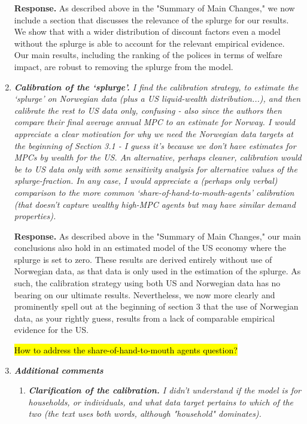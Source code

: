 \documentclass[12pt,letterpaper,english]{article}
\begin{document}
\begin{enumerate}
	\noindent \textbf{Response.} As described above in the "Summary of Main Changes," we now include a section that discusses the relevance of the splurge for our results. We show that with a wider distribution of discount factors even a model without the splurge is able to account for the relevant empirical evidence. Our main results, including the ranking of the polices in terms of welfare impact, are robust to removing the splurge from the model. 

	\item \textit{\textbf{Calibration of the `splurge'.} I find the calibration strategy, to estimate the `splurge' on Norwegian data (plus a US liquid-wealth distribution...), and then calibrate the rest to US data only, confusing - also since the authors then compare their final average annual MPC to an estimate for Norway. I would appreciate a clear motivation for why we need the Norwegian data targets at the beginning of Section 3.1 - I guess it's because we don't have estimates for MPCs by wealth for the US. An alternative, perhaps cleaner, calibration would be to US data only with some sensitivity analysis for alternative values of the splurge-fraction. In any case, I would appreciate a (perhaps only verbal) comparison to the more common `share-of-hand-to-mouth-agents' calibration (that doesn't capture wealthy high-MPC agents but may have similar demand properties).}
	
	\noindent \textbf{Response.} As described above in the "Summary of Main Changes," our main conclusions also hold in an estimated model of the US economy where the splurge is set to zero. These results are derived entirely without use of Norwegian data, as that data is only used in the estimation of the splurge. As such, the calibration strategy using both US and Norwegian data has no bearing on our ultimate results. Nevertheless, we now more clearly and prominently spell out at the beginning of section 3 that the use of Norwegian data, as your rightly guess, results from a lack of comparable empirical evidence for the US. 
	
	\hl{How to address the share-of-hand-to-mouth agents question?}

\bigskip
\bigskip

\item \textit{\textbf{Additional comments}} 

	\begin{enumerate}
		\item \textit{\textbf{Clarification of the calibration.} I didn't understand if the model is for households, or individuals, and what data target pertains to which of the two (the text uses both words, although "household" dominates).}
		

\end{enumerate}
\end{enumerate}
\end{document}
